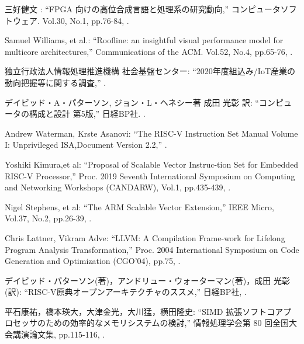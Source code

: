 {\small 三好健文 : %
\newblock ``FPGA 向けの高位合成言語と処理系の研究動向,''
\newblock コンピュータソフトウェア. 
\newblock Vol.30,
\newblock No.1,
\newblock pp.76-84,
.}

{\small Samuel Williams, et al.: %
\newblock ``Roofline: an insightful visual performance model for multicore architectures,''
\newblock Communications of the ACM. 
\newblock Vol.52,
\newblock No.4,
\newblock pp.65-76,
.}

{\small 独立行政法人情報処理推進機構 社会基盤センター: %
\newblock ``2020年度組込み/IoT産業の動向把握等に関する調査,''
.}

{\small デイビッド・A・パターソン, ジョン・L・ヘネシー著 成田 光彰 訳: %
\newblock ``コンピュータの構成と設計 第5版,''
\newblock 日経BP社. 
.}

{\small Andrew Waterman, Krste Asanovi: %
\newblock ``The RISC-V Instruction Set Manual Volume I: Unprivileged ISA,Document Version 2.2,''
.}

{\small Yoshiki Kimura,et al:      %
\newblock ``Proposal of Scalable Vector Instruc-tion Set for Embedded RISC-V Processor,''
\newblock Proc. 2019 Seventh International Symposium on Computing and Networking Workshops (CANDARW),
\newblock Vol.1,
\newblock pp.435-439,
.}

{\small Nigel Stephens, et al:      %
\newblock ``The ARM Scalable Vector Extension,''
\newblock IEEE Micro,
\newblock Vol.37,
\newblock No.2,
\newblock pp.26-39,
.}

{\small Chris Lattner, Vikram Adve:      %
\newblock ``LLVM: A Compilation Frame-work for Lifelong Program Analysis Transformation,''
\newblock Proc. 2004 International Symposium on Code Generation and Optimization (CGO’04),
\newblock pp.75,
.}

{\small デイビッド・パターソン(著)，アンドリュー・ウォーターマン(著)，成田 光彰(訳):      %
\newblock ``RISC-V原典オープンアーキテクチャのススメ,''
\newblock 日経BP社,
.}

{\small 平石康祐，橋本瑛大，大津金光，大川猛，横田隆史:      %
\newblock ``SIMD 拡張ソフトコアプロセッサのための効率的なメモリシステムの検討,''
\newblock 情報処理学会第 80 回全国大会講演論文集,
\newblock pp.115-116,
.}
